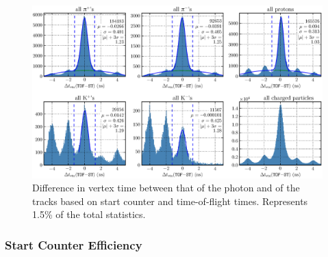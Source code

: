 \begin{figure}[htbp]\begin{center}
\includegraphics[width=0.9\columnwidth]{figures/calib/st/dvertex_time_st.eps}
\caption[vertex timing, ]{\label{fig:dvertex_time_st}Difference in vertex time between that of the photon and of the tracks based on start counter and time-of-flight times. Represents 1.5\% of the total statistics.}
\end{center}\end{figure}


\subsubsection{\label{sec:calib.st.eff}Start Counter Efficiency}

\FloatBarrier
